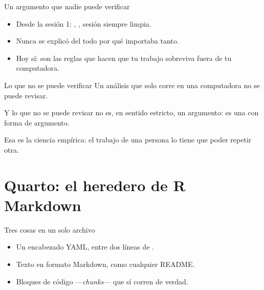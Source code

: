 \begin{frame}{Un argumento que nadie puede verificar}
  \vspace{0.3em}
  \begin{itemize}\setlength{\itemsep}{0.85em}
    \item<1-> Desde la sesión 1: , , sesión siempre limpia.
    \item<2-> Nunca se explicó del todo por qué importaba tanto.
    \item<3-> Hoy sí: son las reglas que hacen que tu trabajo sobreviva fuera
          de tu computadora.
  \end{itemize}

  \vspace{1.0em}
\end{frame}

\begin{frame}{Lo que no se puede verificar}
  \vspace{0.4em}
  Un análisis que solo corre en una computadora no se puede revisar.

  \vspace{0.8em}
  Y lo que no se puede revisar no es, en sentido estricto, un
  \ac{argumento}: es una  con forma de argumento.

  \vspace{1.1em}
  {\small\color{grisTenue}Esa es la ciencia empírica: el trabajo de una
  persona lo tiene que poder repetir otra.}
\end{frame}

\section{Quarto: el heredero de R Markdown}

\begin{frame}{Tres cosas en un solo archivo}
  \vspace{0.3em}
  \begin{itemize}\setlength{\itemsep}{0.9em}
    \item<1-> Un encabezado \ac{YAML}, entre dos líneas de \cod{---}.
    \item<2-> \ac{Texto} en formato Markdown, como cualquier README.
    \item<3-> Bloques de código —\textit{chunks}— que sí corren de verdad.
  \end{itemize}

  \vspace{1.1em}
\end{frame}

